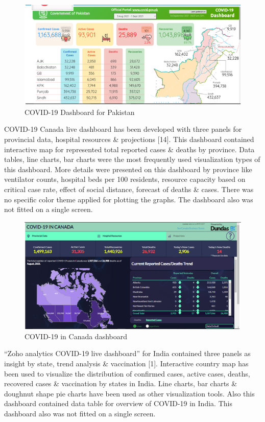 \documentclass[
]{article}
\begin{document}
\begin{figure}
\includegraphics[width=8.33in]{Images/7} \caption{COVID-19 Dashboard for Pakistan}\label{fig:unnamed-chunk-14}
\end{figure}

COVID-19 Canada live dashboard has been developed with three panels for
provincial data, hospital resources \& projections {[}14{]}. This
dashboard contained interactive map for represented total reported cases
\& deaths by province. Data tables, line charts, bar charts were the
most frequently used visualization types of this dashboard. More details
were presented on this dashboard by province like ventilator counts,
hospital beds per 100 residents, resource capacity based on critical
case rate, effect of social distance, forecast of deaths \& cases. There
was no specific color theme applied for plotting the graphs. The
dashboard also was not fitted on a single screen.

\begin{figure}
\includegraphics[width=8.47in]{Images/8} \caption{COVID-19 in Canada dashboard}\label{fig:unnamed-chunk-15}
\end{figure}

``Zoho analytics COVID-19 live dashboard'' for India contained three
panels as insight by state, trend analysis \& vaccination {[}1{]}.
Interactive country map has been used to visualize the distribution of
confirmed cases, active cases, deaths, recovered cases \& vaccination by
states in India. Line charts, bar charts \& doughnut shape pie charts
have been used as other visualization tools. Also this dashboard
contained data table for overview of COVID-19 in India. This dashboard
also was not fitted on a single screen.
\end{document}
